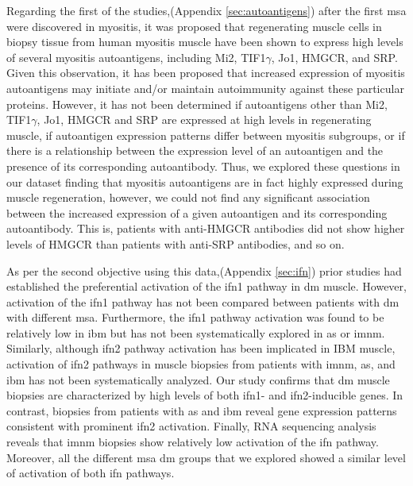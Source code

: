Regarding the first of the studies,(Appendix \autoref{sec:autoantigens}) after the first \gls{msa} were discovered in myositis, it was proposed that regenerating muscle cells in biopsy tissue from human myositis muscle have been shown to express high levels of several myositis autoantigens, including Mi2, TIF1$\gamma$, Jo1, HMGCR, and SRP.\cite{Mohassel2015,Mammen2009,CasciolaRosen2005,Allenbach2018} Given this observation, it has been proposed that increased expression of myositis autoantigens may initiate and/or maintain autoimmunity against these particular proteins. However, it has not been determined if autoantigens other than Mi2, TIF1$\gamma$, Jo1, HMGCR and SRP are expressed at high levels in regenerating muscle, if autoantigen expression patterns differ between myositis subgroups, or if there is a relationship between the expression level of an autoantigen and the presence of its corresponding autoantibody. Thus, we explored these questions in our dataset finding that myositis autoantigens are in fact highly expressed during muscle regeneration, however, we could not find any significant association between the increased expression of a given autoantigen and its corresponding autoantibody. This is, patients with anti-HMGCR antibodies did not show higher levels of HMGCR than patients with anti-SRP antibodies, and so on.

As per the second objective using this data,(Appendix \autoref{sec:ifn}) prior studies had established the preferential activation of the \gls{ifn}1 pathway in \gls{dm} muscle.\cite{Greenberg2005} However, activation of the \gls{ifn}1 pathway has not been compared between patients with \gls{dm} with different \gls{msa}. Furthermore, the \gls{ifn}1 pathway activation was found to be relatively low in \gls{ibm} but has not been systematically explored in \gls{as} or \gls{imnm}.\cite{Greenberg2005,Salajegheh2010,Greenberg2002} Similarly, although \gls{ifn}2 pathway activation has been implicated in IBM muscle,\cite{Ivanidze2011,Allenbach2014} activation of \gls{ifn}2 pathways in muscle biopsies from patients with \gls{imnm}, \gls{as}, and \gls{ibm} has not been systematically analyzed. Our study confirms that \gls{dm} muscle biopsies are characterized by high levels of both \gls{ifn}1- and \gls{ifn}2-inducible genes. In contrast, biopsies from patients with \gls{as} and \gls{ibm} reveal gene expression patterns consistent with prominent \gls{ifn}2 activation. Finally, RNA sequencing analysis reveals that \gls{imnm} biopsies show relatively low activation of the \gls{ifn} pathway. Moreover, all the different \gls{msa} \gls{dm} groups that we explored showed a similar level of activation of both \gls{ifn} pathways.

